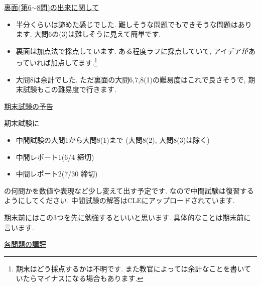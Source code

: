 \documentclass[uplatex,dvipdfmx,a4paper,14pt]{jsarticle}
\begin{document}
{\large  \underline{裏面(第6$\sim$8問)の出来に関して}}
\begin{itemize}
\item 半分くらいは諦めた感じでした. 難しそうな問題でもできそうな問題はあります. 大問6の(3)は難しそうに見えて簡単です. 
\item 裏面は加点法で採点しています. ある程度ラフに採点していて, アイデアがあっていれば加点してます.\footnote{期末はどう採点するかは不明です. また教官によっては余計なことを書いていたらマイナスになる場合もあります. }
\item 大問8は余計でした. ただ裏面の大問6,7,8(1)の難易度はこれで良さそうで, 期末試験もこの難易度で行きます.  
\end{itemize}

  \vspace{5pt}

{\large  \underline{期末試験の予告}}

期末試験に
\begin{itemize}
\item 中間試験の大問1から大問8(1)まで (大問8(2), 大問8(3)は除く)
\item 中間レポート1(6/4 締切)
\item 中間レポート2(7/30 締切)
\end{itemize}
の何問かを数値や表現など少し変えて出す予定です. 
なので中間試験は復習するようにしてください. 中間試験の解答はCLEにアップロードされています. 

期末前にはこの3つを先に勉強するといいと思います. 具体的なことは期末前に言います.

\vspace{5pt}

\newpage
{\large  \underline{各問題の講評}}
\end{document}
